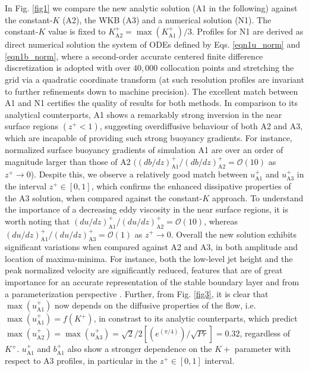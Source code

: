 %
In Fig. \ref{fig1} we compare the new analytic solution (A1 in the following) against the constant-$K$ (A2), the WKB (A3) and a numerical solution (N1).
The constant-$K$ value is fixed to $K^+_{\mathrm{A2}} = \max(K_{\mathrm{A1}}^+)/3$. 
Profiles for N1 are derived as direct numerical solution the system of ODEs defined by Eqs. \ref{eqn1u_norm} and \ref{eqn1b_norm}, where a second-order accurate centered finite difference discretization is adopted with over $40,000$ collocation points and stretching the grid via a quadratic coordinate transform (at such resolution profiles are invariant to further refinements down to machine precision).
The excellent match between A1 and N1 certifies the quality of results for both methods. 
In comparison to its analytical counterparts, A1 shows a remarkably strong inversion in the near surface regions $(z^+ <1)$, suggesting overdiffusive behaviour of both A2 and A3, which are incapable of providing such strong buoyancy gradients. 
For instance, normalized surface buoyancy gradients of simulation A1 are over an order of magnitude larger than those of A2 $( (db/dz)^+_\mathrm{A1}/(db/dz)^+_\mathrm{A2} = \mathcal{O}(10)$ as $z^+ \rightarrow 0$).
Despite this, we observe a relatively good match between $u^+_\mathrm{A1}$ and $u^+_\mathrm{A3}$ in the interval $z^+ \in [0,1]$, which confirms the enhanced dissipative properties of the A3 solution, when compared against the constant-$K$ approach. 
To understand the importance of a decreasing eddy viscosity in the near surface regions, it is worth noting that $(du/dz)^+_\mathrm{A1}/(du/dz)^+_\mathrm{A2} = \mathcal{O}(10)$, whereas $(du/dz)^+_\mathrm{A1}/(du/dz)^+_\mathrm{A3}= \mathcal{O}(1)$ as $z^+ \rightarrow 0$.
Overall the new solution exhibits significant variations when compared against A2 and A3, in both amplitude and location of maxima-minima. 
For instance, both the low-level jet height and the peak normalized velocity are significantly reduced, features that are of great importance for an accurate representation of the stable boundary layer and from a parameterization perspective \citep{Mahrt1998}.
Further, from Fig. \ref{fig3}, it is clear that $\max{(u^+_\mathrm{A1})}$ now depends on the diffusive properties of the flow, i.e. $\max{(u^+_{\mathrm{A1}})} = f(K^+)$, in constrast to its analytic counterparts, which predict $\max{(u^+_\mathrm{A2})} = \max{(u^+_\mathrm{A3})} =  \sqrt{2}/2 [(e^{(\pi/4)})/\sqrt{Pr}] = 0.32$, regardless of $K^+$.
$u^+_{\mathrm{A1}}$ and $b^+_{\mathrm{A1}}$ also show a stronger dependence on the $K+$ parameter with respect to A3 profiles, in particular in the $z^+ \in [0,1]$ interval.
